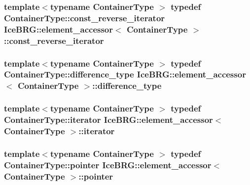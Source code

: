 \subsubsection[{const\+\_\+reverse\+\_\+iterator}]{\setlength{\rightskip}{0pt plus 5cm}template$<$typename Container\+Type $>$ typedef Container\+Type\+::const\+\_\+reverse\+\_\+iterator {\bf Ice\+B\+R\+G\+::element\+\_\+accessor}$<$ Container\+Type $>$\+::{\bf const\+\_\+reverse\+\_\+iterator}}\label{classIceBRG_1_1element__accessor_a32ea1ca6966b5093370f8944efedc471}
\hypertarget{classIceBRG_1_1element__accessor_a2f4224314d26679948777aa2b1121148}{}
\subsubsection[{difference\+\_\+type}]{\setlength{\rightskip}{0pt plus 5cm}template$<$typename Container\+Type $>$ typedef Container\+Type\+::difference\+\_\+type {\bf Ice\+B\+R\+G\+::element\+\_\+accessor}$<$ Container\+Type $>$\+::{\bf difference\+\_\+type}}\label{classIceBRG_1_1element__accessor_a2f4224314d26679948777aa2b1121148}
\hypertarget{classIceBRG_1_1element__accessor_a464911efedf30917f238c5fb4746cd09}{}
\subsubsection[{iterator}]{\setlength{\rightskip}{0pt plus 5cm}template$<$typename Container\+Type $>$ typedef Container\+Type\+::iterator {\bf Ice\+B\+R\+G\+::element\+\_\+accessor}$<$ Container\+Type $>$\+::{\bf iterator}}\label{classIceBRG_1_1element__accessor_a464911efedf30917f238c5fb4746cd09}
\hypertarget{classIceBRG_1_1element__accessor_a9d67afd8fb73e97d728564567ff42609}{}
\subsubsection[{pointer}]{\setlength{\rightskip}{0pt plus 5cm}template$<$typename Container\+Type $>$ typedef Container\+Type\+::pointer {\bf Ice\+B\+R\+G\+::element\+\_\+accessor}$<$ Container\+Type $>$\+::{\bf pointer}}\label{classIceBRG_1_1element__accessor_a9d67afd8fb73e97d728564567ff42609}
\hypertarget{classIceBRG_1_1element__accessor_ae31e9fe4b35d76ed6055052fb788de13}{}

